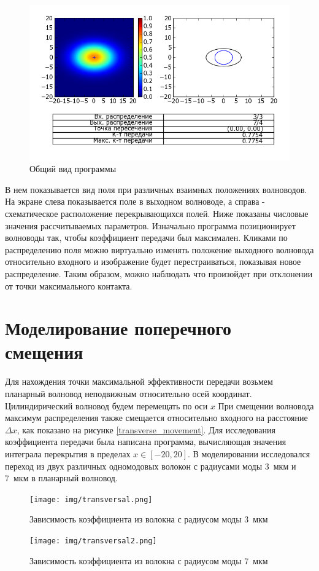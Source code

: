 \begin{figure}[h!]
	\includegraphics[width=\linewidth]{img/heatmap.png}
	\caption{Общий вид программы}
\end{figure}

В нем показывается вид поля при различных взаимных положениях волноводов. На экране слева показывается поле в выходном волноводе, а справа - схематическое расположение перекрывающихся полей. Ниже показаны числовые значения рассчитываемых параметров. Изначально программа позиционирует волноводы так, чтобы коэффициент передачи был максимален. Кликами по распределению поля можно виртуально изменять положение выходного волновода относительно входного и изображение будет перестраиваться, показывая новое распределение. Таким образом, можно наблюдать что произойдет при отклонении от точки максимального контакта.

\section{Моделирование поперечного смещения}
\label{transverse_section}
Для нахождения точки максимальной эффективности передачи возьмем планарный волновод неподвижным относительно осей координат. Цилиндирический волновод будем перемещать по оси $x$ При смещении волновода максимум распределения также смещается относительно входного на расстояние $\Delta x$, как показано на рисунке \ref{transverse_movement}. Для исследования коэффициента передачи была написана программа, вычисляющая значения интеграла перекрытия в пределах $x \in [-20, 20]$.
В моделировании исследовался переход из двух различных одномодовых волокон с радиусами моды 3~мкм и 7~мкм в планарный волновод. 

\begin{figure}[h!]
		\texttt{[image: img/transversal.png]}
		\caption{Зависимость коэффициента из волокна с радиусом моды 3~мкм}
\end{figure}
\begin{figure}[h!]
		\texttt{[image: img/transversal2.png]}
		\caption{Зависимость коэффициента из волокна с радиусом моды 7~мкм}
		\label{twoCylinders2}
\end{figure}

